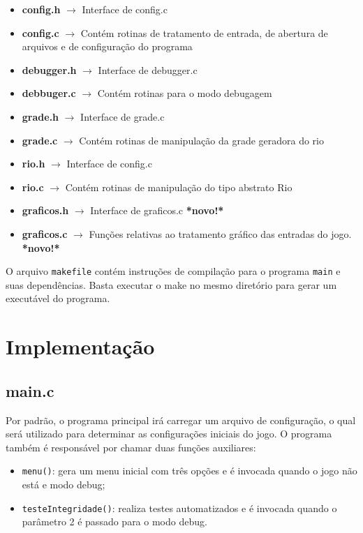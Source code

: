 \documentclass[11pt,a4paper]{article}
\begin{document}
\begin{itemize}
\item \textbf{config.h} $\rightarrow$ Interface de config.c
\item \textbf{config.c} $\rightarrow$ Contém rotinas de tratamento de entrada, de abertura de arquivos e de configuração do programa
\item \textbf{debugger.h} $\rightarrow$ Interface de debugger.c
\item \textbf{debbuger.c} $\rightarrow$ Contém rotinas para o modo debugagem
\item \textbf{grade.h} $\rightarrow$ Interface de grade.c
\item \textbf{grade.c} $\rightarrow$ Contém rotinas de manipulação da grade geradora do rio
\item \textbf{rio.h} $\rightarrow$ Interface de config.c
\item \textbf{rio.c} $\rightarrow$ Contém rotinas de manipulação do tipo abstrato Rio
\item \textbf{graficos.h} $\rightarrow$ Interface de graficos.c \textbf{*novo!*}
\item \textbf{graficos.c} $\rightarrow$ Funções relativas ao tratamento gráfico das entradas do jogo. \textbf{*novo!*}
\end{itemize}

O arquivo \verb|makefile| contém instruções de compilação para o programa \verb|main| e suas dependências. Basta executar o make no mesmo diretório para gerar um executável do programa.

\section{Implementação}
\subsection{main.c}
Por padrão, o programa principal irá carregar um arquivo de configuração, o qual será utilizado para determinar as configurações iniciais do jogo. O programa também é responsável por chamar duas funções auxiliares:

\begin{itemize}
\item \verb|menu()|: gera um menu inicial com três opções e é invocada quando o jogo não está e modo debug;
\item \verb|testeIntegridade()|: realiza testes automatizados e é invocada quando o parâmetro 2 é passado para o modo debug. 
\end{itemize}
\newpage
\end{document}
